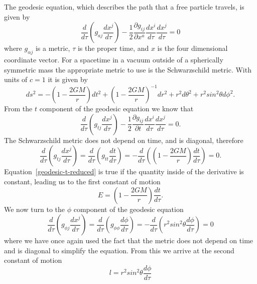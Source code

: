 The geodesic equation, which describes the path that a free particle travels, is given by
\begin{equation} \label{geodesic}
\frac{d}{d\tau} \left(g_{aj} \frac{dx^j}{d\tau} \right)-\frac{1}{2}\frac{\partial g_{ij}}{\partial x^a} \frac{dx^i}{d\tau}\frac{dx^j}{d\tau} = 0
\end{equation}
where $g_{\alpha j}$ is a metric, $\tau$ is the proper time, and $x$ is the four dimensional coordinate vector. For a spacetime in a vacuum outside of a spherically symmetric mass the appropriate metric to use is the Schwarzschild metric.  With units of $c=1$ it is given by
\begin{equation} \label{s-metric}
ds^2 = -\left(1-\frac{2GM}{r}\right)dt^2 + \left(1-\frac{2GM}{r}\right)^{-1}dr^2+r^2 d \theta^2 + r^2 sin^2 \theta d\phi^2.
\end{equation}
From the $t$ component of the geodesic equation we know that
\begin{equation} \label{geodesic-t}
\frac{d}{d \tau} \left(g_{tj}\frac{dx^j}{d\tau}\right) - \frac{1}{2} \frac{\partial g_{ij}}{\partial t} \frac{dx^i}{d\tau} \frac{dx^j}{d \tau} =0.
\end{equation}
The Schwarzschild metric does not depend on time, and is diagonal, therefore
\begin{equation} \label{geodesic-t-reduced}
\frac{d}{d \tau} \left(g_{tj}\frac{dx^j}{d\tau} \right) = \frac{d}{d \tau} \left(g_{tt}\frac{dt}{d\tau}\right) = -\frac{d}{d \tau}\left( \left(1-\frac{2GM}{r}\right)\frac{dt}{d\tau}\right) = 0.
\end{equation}
Equation~\ref{geodesic-t-reduced} is true if the quantity inside of the derivative is constant, leading us to the first constant of motion
\begin{equation}\label{first com}
E=\left(1-\frac{2GM}{r}\right)\frac{dt}{d\tau}.
\end{equation}
We now turn to the $\phi$ component of the geodesic equation
\begin{equation} \label{geodesic-phi}
\frac{d}{d \tau}\left(g_{\phi j}\frac{dx^j}{d\tau}\right) = \frac{d}{d \tau}\left(g_{\phi \phi}\frac{d\phi}{d\tau}\right) = -\frac{d}{d \tau}\left(r^2 sin^2 \theta \frac{d\phi}{d\tau}\right) = 0
\end{equation}
where we have once again used the fact that the metric does not depend on time and is diagonal to simplify the equation.  From this we arrive at the second constant of motion
\begin{equation} \label{second com}
l=r^2sin^2\theta \frac{d\phi}{d \tau}
\end{equation}
